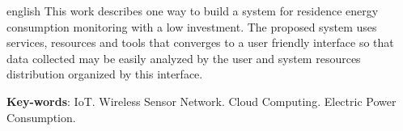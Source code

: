 \begin{resumo}[Abstract]
 \begin{otherlanguage*}{english}
   This work describes one way to build a system for residence energy consumption monitoring with a low investment. The proposed system uses services, resources and tools that converges to a user friendly interface so that data collected may be easily analyzed by the user and system resources distribution organized by this interface.

   \vspace{\onelineskip}
 
   \noindent 
   \textbf{Key-words}: IoT. Wireless Sensor Network. Cloud Computing. Electric Power Consumption.
 \end{otherlanguage*}
\end{resumo}
